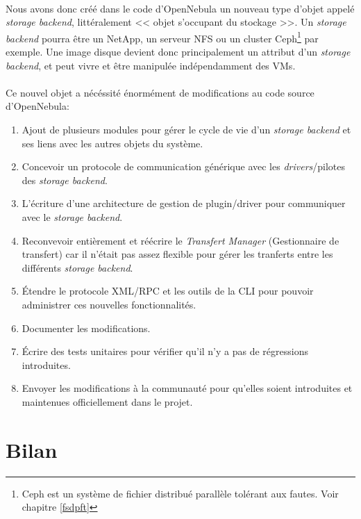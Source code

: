 \paragraph*{}
Nous avons donc créé dans le code d'OpenNebula un nouveau type d'objet appelé \emph{storage backend}, littéralement << objet s'occupant du stockage >>.
Un \emph{storage backend} pourra être un NetApp, un serveur NFS ou un cluster Ceph\footnote{Ceph est un système de fichier distribué parallèle tolérant aux fautes.
Voir chapitre \ref{fsdpft}} par exemple. Une image disque devient donc principalement un attribut d'un
\emph{storage backend}, et peut vivre et être manipulée indépendamment des VMs.


\paragraph*{}
Ce nouvel objet a nécéssité énormément de modifications au code source d'OpenNebula:
\begin{enumerate}
	\item Ajout de plusieurs modules pour gérer le cycle de vie d'un \emph{storage backend} et ses liens avec les autres objets du système.
	\item Concevoir un protocole de communication générique avec les \emph{drivers}/pilotes des \emph{storage backend}.
	\item L'écriture d'une architecture de gestion de plugin/driver pour communiquer avec le \emph{storage backend}.
	\item Reconvevoir entièrement et réécrire le \emph{Transfert Manager} (Gestionnaire de transfert) car il n'était pas assez flexible
		pour gérer les tranferts entre les différents \emph{storage backend}.
	\item Étendre le protocole XML/RPC et les outils de la CLI pour pouvoir administrer ces nouvelles fonctionnalités.
	\item Documenter les modifications.
	\item Écrire des tests unitaires pour vérifier qu'il n'y a pas de régressions introduites.
	\item Envoyer les modifications à la communauté pour qu'elles soient introduites et maintenues officiellement dans le projet.
\end{enumerate}

\section{Bilan}

